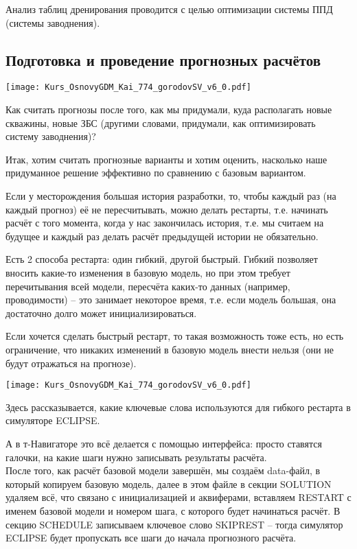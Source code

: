 \documentclass[main.tex]{subfiles}
\begin{document}
Анализ таблиц дренирования проводится с целью оптимизации системы ППД (системы заводнения).

\subsection{Подготовка и проведение прогнозных расчётов}

\texttt{[image: Kurs\_OsnovyGDM\_Kai\_774\_gorodovSV\_v6\_0.pdf]}

Как считать прогнозы после того, как мы придумали, куда располагать новые скважины, новые ЗБС (другими словами, придумали, как оптимизировать систему заводнения)?

Итак, хотим считать прогнозные варианты и хотим оценить, насколько наше придуманное решение эффективно по сравнению с базовым вариантом.

Если у месторождения большая история разработки, то, чтобы каждый раз (на каждый прогноз) её не пересчитывать, можно делать рестарты, т.е. начинать расчёт с того момента, когда у нас закончилась история, т.е. мы считаем на будущее и каждый раз делать расчёт предыдущей истории не обязательно.

Есть 2 способа рестарта: один гибкий, другой быстрый.
Гибкий позволяет вносить какие-то изменения в базовую модель, но при этом требует перечитывания всей модели, пересчёта каких-то данных (например, проводимости) -- это занимает некоторое время, т.е. если модель большая, она достаточно долго может инициализироваться.

Если хочется сделать быстрый рестарт, то такая возможность тоже есть, но есть ограничение, что никаких изменений в базовую модель внести нельзя (они не будут отражаться на прогнозе).

\texttt{[image: Kurs\_OsnovyGDM\_Kai\_774\_gorodovSV\_v6\_0.pdf]}

Здесь рассказывается, какие ключевые слова используются для гибкого рестарта в симуляторе ECLIPSE.

А в т-Навигаторе это всё делается с помощью интерфейса: просто ставятся галочки, на какие шаги нужно записывать результаты расчёта.
\\

После того, как расчёт базовой модели завершён, мы создаём data-файл, в который копируем базовую модель, далее в этом файле в секции SOLUTION удаляем всё, что связано с инициализацией и аквиферами, вставляем RESTART с именем базовой модели и номером шага, с которого будет начинаться расчёт.
В секцию SCHEDULE записываем ключевое слово SKIPREST -- тогда симулятор ECLIPSE будет пропускать все шаги до начала прогнозного расчёта.
\end{document}
